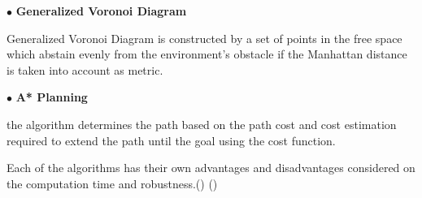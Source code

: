 $\bullet$ \textbf{Generalized Voronoi Diagram}\par
Generalized Voronoi Diagram is constructed by a set of points in the free space which abstain evenly from the environment's obstacle if the Manhattan distance is taken into account as metric. \par

$\bullet$ \textbf{A* Planning}\par
the algorithm determines the path based on the path cost and cost estimation required to extend the path until the goal using the cost function.\par

Each of the algorithms has their own advantages and disadvantages considered on the computation time and robustness.(\cite{duchovn2014path}) (\cite{inproceedings})
\par

